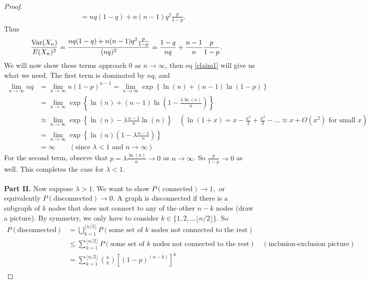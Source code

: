 \documentclass[./some_latex_template.tex]{subfiles}
\begin{document}
\begin{proof}
\begin{align*}
	&= nq(1-q) + n(n-1)q^2\frac{p}{1-p}.
\end{align*}
Thus 
\begin{align*}
	\frac{\mathop{\rm Var}\nolimits(X_n)}{E(X_n)^2} 
	&= \frac{nq(1-q) + n(n-1)q^2\frac{p}{1-p}}{(nq)^2} = \frac{1-q}{nq} + \frac{n-1}{n}\frac{p}{1-p}.
\end{align*}
We will now show these terms approach 0 as $n \rightarrow \infty$, then eq \eqref{claim1} will give us what we need.
The first term is dominated by $nq$, and
\begin{align*}
	\lim_{n \rightarrow \infty} nq 
	&= \lim_{n \rightarrow \infty} n(1-p)^{n-1} = \lim_{n \rightarrow \infty}  \exp \left\{ \ln(n) + (n-1)\ln(1 - p) \right\}\\
	&= \lim_{n \rightarrow \infty} \exp \left\{ \ln(n) + (n-1)\ln\left( 1 - \frac{\lambda \ln(n)}{n} \right) \right\}\\
	&\approx \lim_{n \rightarrow \infty} \exp \left\{ \ln(n) - \lambda\frac{n-1}{n}\ln(n) \right\} \quad \left(\ln(1 + x) = x - \frac{x^2}{2} + \frac{x^3}{3} -... \approx x + O(x^2) \text{ for small }x\right)\\
	&= \lim_{n \rightarrow \infty} \exp \left\{ \ln(n)\left( 1 - \lambda\frac{n-1}{n} \right) \right\}\\
	&= \infty \qquad \left(\text{since } \lambda < 1 \text{ and } n \rightarrow \infty \right)
\end{align*}
For the second term, observe that $p = \lambda \frac{\ln(n)}{n} \rightarrow 0$ as $n \rightarrow \infty$. So $\frac{p}{1-p} \rightarrow 0$ as well. This completes the case for $\lambda < 1$. \\
\\
\textbf{Part II.} Now suppose $\lambda > 1$. We want to show $P(\text{connected})\rightarrow 1,$ or equivalently $P(\text{disconnected})\rightarrow 0$. A graph is disconnected if there is a subgraph of $k$ nodes that does not connect to any of the other $n - k$ nodes (draw a picture). By symmetry, we only have to consider $k \in \{1, 2, ... \lfloor n/2 \rfloor\}$.  So 
\begin{align*}
	P(\text{disconnected}) 
	&= \bigcup_{k=1}^{\lfloor n/2 \rfloor} P(\text{some set of } k \text{ nodes not connected to the rest})\\
	&\le \sum_{k=1}^{\lfloor n/2 \rfloor} P(\text{some set of } k \text{ nodes not connected to the rest}) \quad (\text{inclusion-exclusion picture})\\
	&= \sum_{k=1}^{\lfloor n/2 \rfloor} {n \choose k} \left[ (1-p)^{(n - k)} \right]^k\\

\end{align*}
\end{proof}
\end{document}

